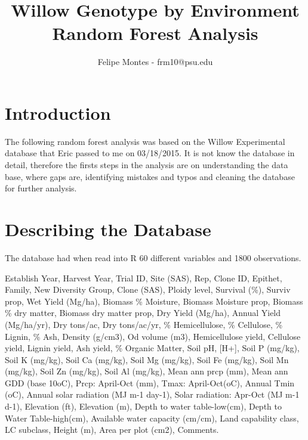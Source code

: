 \documentclass{article}\usepackage[]{graphicx}\usepackage[]{color}
\begin{document}
\title{Willow Genotype by Environment\\ Random Forest Analysis}
\author{Felipe Montes - frm10@psu.edu}
\maketitle


\section*{Introduction}

The following random forest analysis was based on the Willow Experimental database that Eric passed to me on 03/18/2015. It is not know the database in detail, therefore the firsts steps in the analysis are on understanding the data base, where gaps are, identifying mistakes and typos and cleaning the database for further analysis.



\section*{Describing the Database}

The database had when read into R 60 different variables and 1800 observations.

Establish Year,  Harvest Year,  Trial ID,	Site (SAS),	Rep,	Clone ID,	Epithet,	Family,	New Diversity Group,	Clone (SAS),	Ploidy level,	Survival (\%),	Surviv prop,	Wet Yield (Mg/ha),	Biomass \% Moisture,	Biomass Moisture prop,	Biomass \% dry matter,	Biomass dry matter prop,	Dry Yield (Mg/ha),	Annual Yield (Mg/ha/yr),	Dry tons/ac,	Dry tons/ac/yr,	\% Hemicellulose,	\% Cellulose,	\% Lignin,	\% Ash,	Density (g/cm3),	Od volume (m3),	Hemicellulose yield, Cellulose yield,	Lignin yield,	Ash yield,	\% Organic Matter,	Soil pH,	[H+],	Soil P (mg/kg),	Soil K (mg/kg),	Soil Ca (mg/kg),	Soil Mg (mg/kg),	Soil Fe (mg/kg),	Soil Mn (mg/kg),	Soil Zn (mg/kg),	Soil Al (mg/kg),	Mean ann prcp (mm),	Mean ann GDD (base 10oC),	Prcp: April-Oct (mm),	Tmax: April-Oct(oC),	Annual Tmin (oC),	Annual solar radiation (MJ m-1 day-1),	Solar radiation: Apr-Oct (MJ m-1 d-1),	Elevation (ft),	Elevation (m),	Depth to water table-low(cm),	Depth to Water Table-high(cm),	Available water capacity (cm/cm),	Land capability class,	LC subclass,	Height (m),	Area per plot (cm2),	Comments.\\
\end{document}
